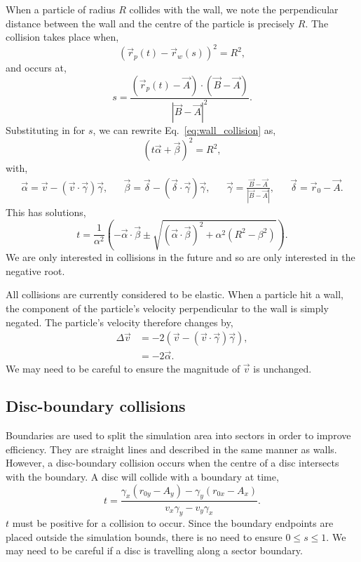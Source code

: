 \documentclass{article}
\begin{document}
When a particle of radius $R$ collides with the wall, we note the perpendicular distance between the wall and the centre of the particle is precisely $R$. The collision takes place when,
\begin{equation}
\label{eq:wall_collision}
    (\vec{r}_p(t) - \vec{r}_w(s))^2 = R^2,
\end{equation}
and occurs at,
\begin{equation}
    s
    =
    \frac{(\vec{r}_p(t) - \vec{A}) \cdot (\vec{B} - \vec{A})}{|\vec{B} - \vec{A}|^2}.
\end{equation}
Substituting in for $s$, we can rewrite Eq.~\ref{eq:wall_collision} as,
\begin{equation}
    (t\vec{\alpha} + \vec{\beta})^2 = R^2,
\end{equation}
with,
\begin{align}
    \vec{\alpha}
    =
    \vec{v} - (\vec{v} \cdot \vec{\gamma}) \vec{\gamma},
    &&
    \vec{\beta}
    =
    \vec{\delta} - (\vec{\delta} \cdot \vec{\gamma}) \vec{\gamma},
    &&
    \vec{\gamma} = \frac{\vec{B} - \vec{A}}{|\vec{B}-\vec{A}|},
    &&
    \vec{\delta} = \vec{r}_0 - \vec{A}.
\end{align}
This has solutions,
\begin{equation}
\label{eq:wall_collision_sol}
    t
    =
    \frac{1}{\alpha^2}
    \left(
        -\vec{\alpha} \cdot \vec{\beta}
        \pm
        \sqrt{(\vec{\alpha} \cdot \vec{\beta})^2 + \alpha^2(R^2 - \beta^2)}
    \right).
\end{equation}
We are only interested in collisions in the future and so are only interested in the negative root.

All collisions are currently considered to be elastic. When a particle hit a wall, the component of the particle's velocity perpendicular to the wall is simply negated. The particle's velocity therefore changes by,
\begin{align}
    \Delta \vec{v}
    &=
    -2(\vec{v} - (\vec{v} \cdot \vec{\gamma}) \vec{\gamma}), \\
    &=
    -2 \vec{\alpha}.
\end{align}
We may need to be careful to ensure the magnitude of $\vec{v}$ is unchanged.

\subsection{Disc-boundary collisions}
Boundaries are used to split the simulation area into sectors in order to improve efficiency. They are straight lines and described in the same manner as walls. However, a disc-boundary collision occurs when the centre of a disc intersects with the boundary. A disc will collide with a boundary at time,
\begin{equation}
    t
    =
    \frac{\gamma_x (r_{0y} - A_y) - \gamma_y (r_{0x} - A_x)}{v_x \gamma_y - v_y \gamma_x}.
\end{equation}
$t$ must be positive for a collision to occur. Since the boundary endpoints are placed outside the simulation bounds, there is no need to ensure $0 \leq s \leq 1$. We may need to be careful if a disc is travelling along a sector boundary.
\end{document}
